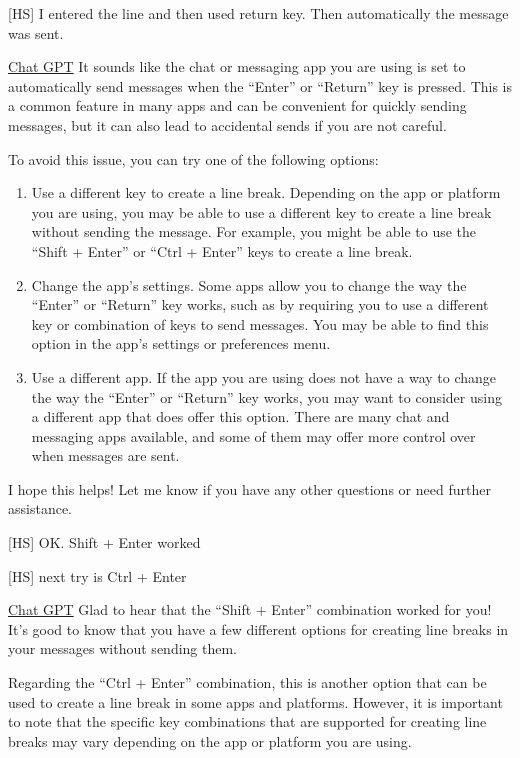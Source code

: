 \documentclass[
]{book}
\providecommand{\tightlist}{%
  \setlength{\itemsep}{0pt}\setlength{\parskip}{0pt}}
\theoremstyle{definition}
\theoremstyle{definition}
\theoremstyle{definition}
\theoremstyle{definition}
\theoremstyle{remark}
\begin{document}
{[}HS{]} I entered the line and then used return key. Then automatically the message was sent.

\protect\hyperlink{chatgpt}{Chat GPT} It sounds like the chat or messaging app you are using is set to automatically send messages when the ``Enter'' or ``Return'' key is pressed. This is a common feature in many apps and can be convenient for quickly sending messages, but it can also lead to accidental sends if you are not careful.

To avoid this issue, you can try one of the following options:

\begin{enumerate}
\def\labelenumi{\arabic{enumi}.}
\tightlist
\item
  Use a different key to create a line break. Depending on the app or platform you are using, you may be able to use a different key to create a line break without sending the message. For example, you might be able to use the ``Shift + Enter'' or ``Ctrl + Enter'' keys to create a line break.
\item
  Change the app's settings. Some apps allow you to change the way the ``Enter'' or ``Return'' key works, such as by requiring you to use a different key or combination of keys to send messages. You may be able to find this option in the app's settings or preferences menu.
\item
  Use a different app. If the app you are using does not have a way to change the way the ``Enter'' or ``Return'' key works, you may want to consider using a different app that does offer this option. There are many chat and messaging apps available, and some of them may offer more control over when messages are sent.
\end{enumerate}

I hope this helps! Let me know if you have any other questions or need further assistance.

{[}HS{]} OK. Shift + Enter worked

{[}HS{]} next try is Ctrl + Enter

\protect\hyperlink{chatgpt}{Chat GPT} Glad to hear that the ``Shift + Enter'' combination worked for you! It's good to know that you have a few different options for creating line breaks in your messages without sending them.

Regarding the ``Ctrl + Enter'' combination, this is another option that can be used to create a line break in some apps and platforms. However, it is important to note that the specific key combinations that are supported for creating line breaks may vary depending on the app or platform you are using.
\end{document}
